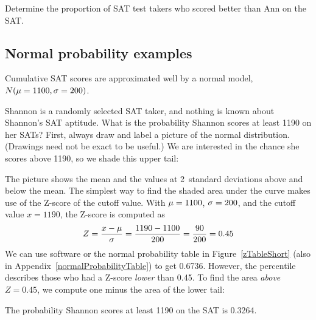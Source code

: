 \begin{exercisewrap}
\begin{nexercise}
Determine the proportion of SAT test takers who scored better
than Ann on the SAT.\footnotemark{}
\end{nexercise}
\end{exercisewrap}


\subsection{Normal probability examples}
\label{normal_probability_examples}

Cumulative SAT scores are approximated well by a normal model,
$N(\mu = 1100{}, \sigma = 200{})$.

\newcommand{\shannonsat}{1190}
\newcommand{\shannonsatz}{0.45}
\begin{examplewrap}
\begin{nexample}{Shannon is a randomly selected SAT taker,
    and nothing is known about Shannon's SAT aptitude.
    What is the probability Shannon scores at least
    \shannonsat{} on her SATs?}
  \label{satAbove1190Exam}%
  First, always draw and label a picture of the normal
  distribution.
  (Drawings need not be exact to be useful.)
  We are interested in the chance she scores above
  \shannonsat{}, so we shade this upper tail:
  \begin{center}
  \end{center}
  The picture shows the mean and the values at
  2~standard deviations above and below the mean.
  The simplest way to find the shaded area under
  the curve makes use of the Z-score of the cutoff value.
  With $\mu = 1100{}$, $\sigma = 200{}$,
  and the cutoff value $x = \shannonsat{}$,
  the Z-score is computed as
  \begin{align*}
  Z = \frac{x - \mu}{\sigma}
    = \frac{\shannonsat{} - \satmean{}}{\satsd{}}
    = \frac{90}{\satsd{}}
    = \shannonsatz{}
  \end{align*}
  We can use software or the normal probability table
  in Figure~\ref{zTableShort}
  (also in Appendix~\vref{normalProbabilityTable})
  to get 0.6736.
  However, the percentile describes those who had a Z-score
  \emph{lower} than \shannonsatz{}.
  To find the area \emph{above} $Z = \shannonsatz{}$,
  we compute one minus the area of the lower tail:
  \begin{center}
  \end{center}
  The probability Shannon scores at least 1190 on the SAT
  is 0.3264.
\end{nexample}
\end{examplewrap}


